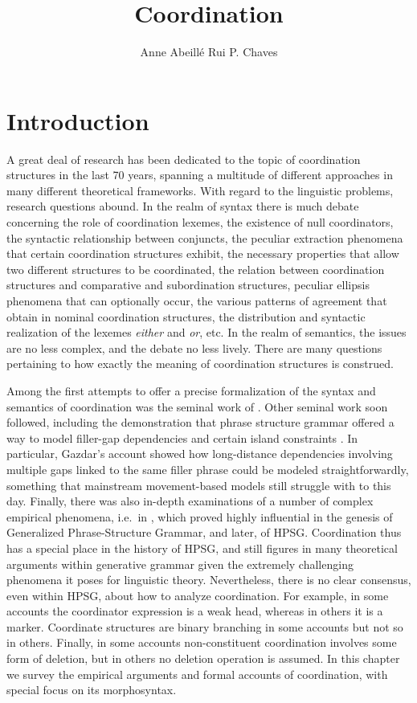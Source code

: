 \documentclass[output=paper
                ,modfonts
                ,nonflat
	        ,collection
	        ,collectionchapter
	        ,collectiontoclongg
 	        ,biblatex
                ,babelshorthands
                ,newtxmath
                ,draftmode
                ,colorlinks, citecolor=brown
]{./langsci/langscibook}
\author{Anne Abeillé\affiliation{Laboratoire de Linguistique Formelle, University of Paris} \lastand Rui P. Chaves\affiliation{Linguistics Department, University at Buffalo, The State University of New York}}
\title{Coordination}
\begin{document}
\maketitle
\label{chap-coordination}

{



\section{Introduction} 

A great deal of research has been dedicated to the topic of coordination structures in the last  70 years, spanning a multitude of different approaches in many different theoretical frameworks.  With regard to the linguistic problems, research questions abound. In the realm of syntax there is much debate concerning the role of coordination lexemes, the existence of null coordinators, the syntactic relationship between conjuncts, the peculiar extraction phenomena that certain coordination structures exhibit, the necessary properties that allow two different structures to be coordinated, the relation between coordination structures and comparative and subordination structures, peculiar ellipsis phenomena that can optionally occur, the various patterns of agreement that obtain in nominal coordination structures, the distribution and syntactic realization of the lexemes \emph{either} and \emph{or}, etc. In the realm of semantics, the issues are no less complex, and the debate no less lively. There are many questions pertaining to how exactly the meaning of coordination structures is construed. 

Among the first attempts to offer a precise formalization of the syntax and semantics of coordination was the seminal work of \citet{gazdarc}. Other seminal work soon followed, including the demonstration that phrase structure grammar offered a way to model filler-gap dependencies and certain island constraints \citep{gazdar}. In particular, Gazdar's account showed how long-distance dependencies involving multiple gaps linked to the same filler phrase could be modeled straightforwardly, something that mainstream movement-based models still struggle with to this day. Finally, there was also 
 in-depth examinations of a number of complex empirical phenomena, i.e.\ in  \citet{gazd1982}, which  proved highly influential in the genesis of Generalized Phrase-Structure Grammar, and later, of HPSG. Coordination thus has a special place in the history of HPSG, and still figures  in many theoretical arguments within generative grammar  given the extremely challenging phenomena it poses for linguistic theory. 
Nevertheless, there is no clear consensus, even within HPSG, about how to analyze coordination. For example, in some accounts the coordinator
expression is a weak head, whereas in others it is a marker. Coordinate structures are binary branching in some accounts but not so in others. Finally, in  some accounts non-constituent coordination involves some form of deletion, but in others no deletion operation is assumed.  
In this chapter we survey the empirical arguments and formal accounts of coordination, with special focus on its morphosyntax.

}
\end{document}
